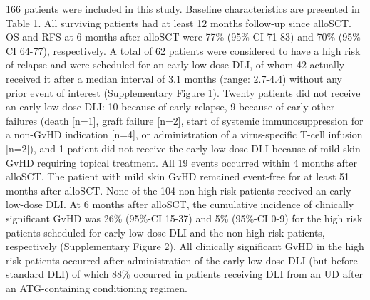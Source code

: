 \documentclass[
  letterpaper,
  paper=240mm:170mm,
  twoside=true,
  open=right,
  fontsize=10pt,
  pagesize=false,
  BCOR=15mm,
  DIV=14,
  headinclude=true,
  footinclude=false,
  headsepline=on]{scrbook}
\begin{document}
166 patients were included in this study. Baseline characteristics are
presented in Table 1. All surviving patients had at least 12 months
follow-up since alloSCT. OS and RFS at 6 months after alloSCT were 77\%
(95\%-CI 71-83) and 70\% (95\%-CI 64-77), respectively. A total of 62
patients were considered to have a high risk of relapse and were
scheduled for an early low-dose DLI, of whom 42 actually received it
after a median interval of 3.1 months (range: 2.7-4.4) without any prior
event of interest (Supplementary Figure 1). Twenty patients did not
receive an early low-dose DLI: 10 because of early relapse, 9 because of
early other failures (death {[}n=1{]}, graft failure {[}n=2{]}, start of
systemic immunosuppression for a non-GvHD indication {[}n=4{]}, or
administration of a virus-specific T-cell infusion {[}n=2{]}), and 1
patient did not receive the early low-dose DLI because of mild skin GvHD
requiring topical treatment. All 19 events occurred within 4 months
after alloSCT. The patient with mild skin GvHD remained event-free for
at least 51 months after alloSCT. None of the 104 non-high risk patients
received an early low-dose DLI. At 6 months after alloSCT, the
cumulative incidence of clinically significant GvHD was 26\% (95\%-CI
15-37) and 5\% (95\%-CI 0-9) for the high risk patients scheduled for
early low-dose DLI and the non-high risk patients, respectively
(Supplementary Figure 2). All clinically significant GvHD in the high
risk patients occurred after administration of the early low-dose DLI
(but before standard DLI) of which 88\% occurred in patients receiving
DLI from an UD after an ATG-containing conditioning regimen.

\begingroup\fontsize{7}{9}\selectfont
\end{document}
